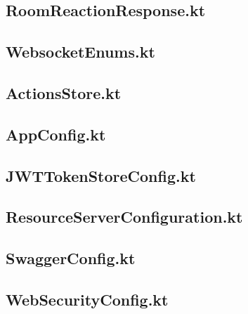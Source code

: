 \documentclass{../includes/TechDoc}
\begin{document}
    \subsection{RoomReactionResponse.kt}
    

    \subsection{WebsocketEnums.kt}
    

    \subsection{ActionsStore.kt}
    

    \subsection{AppConfig.kt}
    

    \subsection{JWTTokenStoreConfig.kt}
    

    \subsection{ResourceServerConfiguration.kt}
    

    \subsection{SwaggerConfig.kt}
    

    \subsection{WebSecurityConfig.kt}
    
\end{document}
